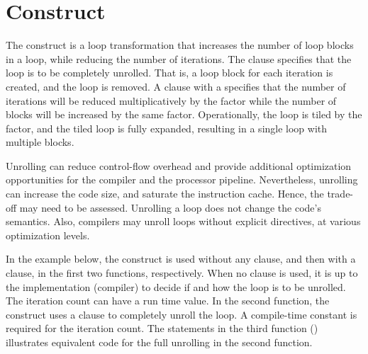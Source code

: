 \pagebreak
\section{ Construct}
\label{sec:unroll}

The  construct is a loop transformation that increases the 
number of loop blocks in a loop, while reducing the number of iterations.
The  clause specifies that the loop is to be completely unrolled.  
That is, a loop block for each iteration is created, and the loop is removed.
A  clause  with a  specifies that the number of 
iterations will be reduced multiplicatively by the factor while the number of 
blocks will be increased by the same factor.  
Operationally, the loop is tiled by the factor, and the tiled loop is 
fully expanded, resulting in a single loop with multiple blocks.

Unrolling can reduce control-flow overhead and provide additional
optimization opportunities for the compiler and the processor
pipeline. Nevertheless, unrolling can increase the code size, and saturate
the instruction cache. Hence, the trade-off may need to be assessed.
Unrolling a loop does not change the code's semantics. Also, compilers
may unroll loops without explicit directives, at various optimization levels.

In the example below, the  construct is used without any clause, and then
with a  clause, in the first two functions, respectively.
When no clause is used, it is up to the implementation (compiler) 
to decide if and how the loop is to be unrolled.  
The iteration count can have a run time value.  
In the second function, the  construct uses a  clause
to completely unroll the loop.  A compile-time constant is required for the iteration count.
The statements in the third function () illustrates
equivalent code for the full unrolling in the second function.



